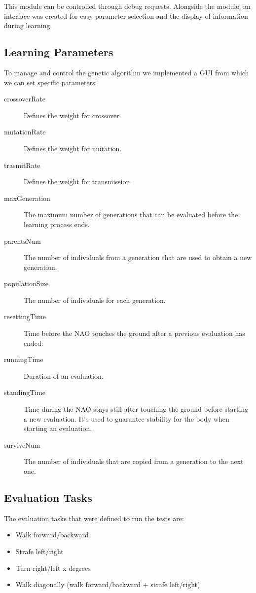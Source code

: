 \documentclass{article}
\begin{document}
This module can be controlled through debug requests. Alongside the module, an interface was created for easy parameter selection and the display of information during learning.

\subsection{Learning Parameters}

To manage and control the genetic algorithm we implemented a GUI from which we can set specific parameters:

\begin{description}
\item[crossoverRate] Defines the weight for crossover.
\item[mutationRate] Defines the weight for mutation.
\item[trasmitRate] Defines the weight for transmission.
\item[maxGeneration] The maximum number of generations that can be evaluated before the learning process ends. 

\item[parentsNum] The number of individuals from a generation that are used to obtain a new generation.
\item[populationSize] The number of individuals for each generation.
\item[resettingTime] Time before the NAO touches the ground after a previous evaluation has ended.
\item[runningTime] Duration of an evaluation.
\item[standingTime] Time during the NAO stays still after touching the ground before starting a new evaluation. It's used to guarantee stability for the body when starting an evaluation.
\item[surviveNum] The number of individuals that are copied from a generation to the next one. 

\end{description}

\subsection{Evaluation Tasks}

The evaluation tasks that were defined to run the tests are:

\begin{itemize}
\item Walk forward/backward 
\item Strafe left/right 
\item Turn right/left x degrees 
\item Walk diagonally (walk forward/backward + strafe left/right) 

\end{itemize}
\end{document}
